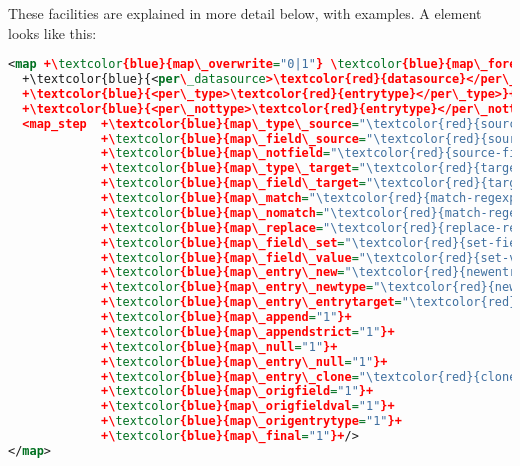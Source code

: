 \documentclass{ltxdockit}
\begin{document}
\noindent These facilities are explained in more detail below, with
examples. A  element looks like this:

\begin{lstlisting}[language=xml,escapechar=+,mathescape=true]
<map +\textcolor{blue}{map\_overwrite="0|1"} \textcolor{blue}{map\_foreach="\textcolor{red}{loopval}"}+>
  +\textcolor{blue}{<per\_datasource>\textcolor{red}{datasource}</per\_datasource>}+
  +\textcolor{blue}{<per\_type>\textcolor{red}{entrytype}</per\_type>}+
  +\textcolor{blue}{<per\_nottype>\textcolor{red}{entrytype}</per\_nottype>}+
  <map_step  +\textcolor{blue}{map\_type\_source="\textcolor{red}{source-entrytype}"}+
             +\textcolor{blue}{map\_field\_source="\textcolor{red}{source-field}"}+
             +\textcolor{blue}{map\_notfield="\textcolor{red}{source-field}"}+
             +\textcolor{blue}{map\_type\_target="\textcolor{red}{target-entrytype}"}+
             +\textcolor{blue}{map\_field\_target="\textcolor{red}{target-field}"}+
             +\textcolor{blue}{map\_match="\textcolor{red}{match-regexp}"}+
             +\textcolor{blue}{map\_nomatch="\textcolor{red}{match-regexp}"}+
             +\textcolor{blue}{map\_replace="\textcolor{red}{replace-regexp}"}+
             +\textcolor{blue}{map\_field\_set="\textcolor{red}{set-field}"}+
             +\textcolor{blue}{map\_field\_value="\textcolor{red}{set-value}"}+
             +\textcolor{blue}{map\_entry\_new="\textcolor{red}{newentrykey}"}+
             +\textcolor{blue}{map\_entry\_newtype="\textcolor{red}{newentrykeytype}"}+
             +\textcolor{blue}{map\_entry\_entrytarget="\textcolor{red}{newentrykey}"}+
             +\textcolor{blue}{map\_append="1"}+
             +\textcolor{blue}{map\_appendstrict="1"}+
             +\textcolor{blue}{map\_null="1"}+
             +\textcolor{blue}{map\_entry\_null="1"}+
             +\textcolor{blue}{map\_entry\_clone="\textcolor{red}{clonekey}"}+
             +\textcolor{blue}{map\_origfield="1"}+
             +\textcolor{blue}{map\_origfieldval="1"}+
             +\textcolor{blue}{map\_origentrytype="1"}+
             +\textcolor{blue}{map\_final="1"}+/>
</map>
\end{lstlisting}%
\end{document}
